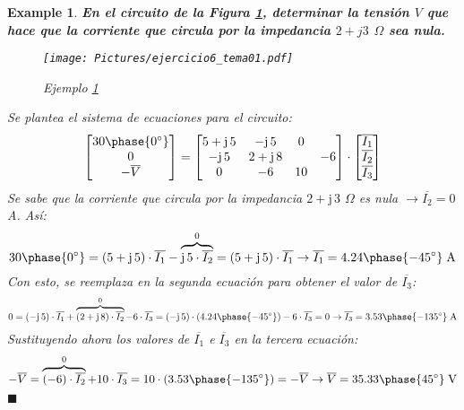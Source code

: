 \documentclass[11pt]{book} %
\numberwithin{dummy}{section}
\theoremstyle{ocrenumbox}
\theoremstyle{blacknumex}
\newtheorem{exampleT}{Example}[chapter]
\theoremstyle{blacknumbox}
\theoremstyle{ocrenum}
\newenvironment{example}{\begin{exampleT}}{\hfill{\tiny\ensuremath{\blacksquare}}\end{exampleT}}
\begin{document}
	\vspace{4mm}
	\begin{example}\label{ej.2-6}
		\textbf{En el circuito de la Figura \ref{fig.ejercicio6_tema01}, determinar la tensión $V$ que hace que la corriente que circula por la impedancia $2+j3$ $\Omega$ sea nula.}
		\begin{figure}[h!]
			\centering
			\texttt{[image: Pictures/ejercicio6\_tema01.pdf]}
			\caption{Ejemplo \ref{ej.2-6}}
			\label{fig.ejercicio6_tema01}
		\end{figure}
		
		Se plantea el sistema de ecuaciones para el circuito: 
		\begin{equation*}
			\begin{bmatrix}
				30\phase{0^\circ} \\
				0 \\
				-\overline{V}
			\end{bmatrix}
			=
			\begin{bmatrix}
				5+\mathrm{j}\,5 & -\mathrm{j}\,5 & 0 \\
				-\mathrm{j}\,5 & 2+\mathrm{j}\,8 & & -6 \\
				0 & -6 & 10 \\
			\end{bmatrix}
			\cdot 
			\begin{bmatrix}
				\overline{I_1} \\
				\overline{I_2} \\
				\overline{I_3}
			\end{bmatrix}
		\end{equation*}
		Se sabe que la corriente que circula por la impedancia $2+\mathrm{j}\,3$ $\Omega$ es nula $\rightarrow \overline{I_2}=0$ A. Así: 
		\begin{equation*}
			30\phase{0^\circ} = (5+\mathrm{j}\,5)\cdot \overline{I_1} - \overbrace{\mathrm{j}\,5\cdot \overline{I_2}}^0 = (5+\mathrm{j}\,5)\cdot \overline{I_1} \rightarrow \overline{I_1} = 4.24\phase{-45^\circ}\;\text{A}
		\end{equation*}
		Con esto, se reemplaza en la segunda ecuación para obtener el valor de $\overline{I_3}$:
		\begin{equation*}
			0 = (-\mathrm{j}\,5)\cdot \overline{I_1} + \overbrace{(2+\mathrm{j}\,8)\cdot \overline{I_2}}^0 -6\cdot \overline{I_3} = (-\mathrm{j}\,5)\cdot (4.24\phase{-45^\circ}) - 6 \cdot \overline{I_3} = 0 \rightarrow \overline{I_3} = 3.53\phase{-135^\circ}\;\text{A}
		\end{equation*}
		Sustituyendo ahora los valores de $\overline{I_1}$ e $\overline{I_3}$ en la tercera ecuación: 
		\begin{equation*}
			-\overline{V}=\overbrace{(-6)\cdot \overline{I_2}}^0 +10\cdot \overline{I_3} = 10 \cdot (3.53\phase{-135^\circ}) = -\overline{V} \rightarrow \overline{V} = 35.33\phase{45^\circ}\;\text{V}
		\end{equation*}
	\end{example}
	
\end{document}
